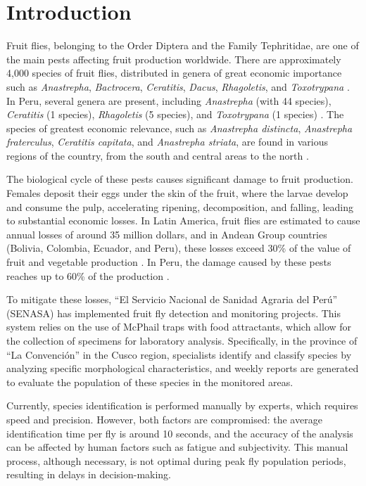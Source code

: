 \section{Introduction}
Fruit flies, belonging to the Order Diptera and the Family Tephritidae, are one of the main pests affecting fruit production worldwide. There are approximately 4,000 species of fruit flies, distributed in genera of great economic importance such as \textit{Anastrepha}, \textit{Bactrocera}, \textit{Ceratitis}, \textit{Dacus}, \textit{Rhagoletis}, and \textit{Toxotrypana} \cite{3ortiz2021, delgado2009moscas}. In Peru, several genera are present, including \textit{Anastrepha} (with 44 species), \textit{Ceratitis} (1 species), \textit{Rhagoletis} (5 species), and \textit{Toxotrypana} (1 species) \cite{iica1997}. The species of greatest economic relevance, such as \textit{Anastrepha distincta}, \textit{Anastrepha fraterculus}, \textit{Ceratitis capitata}, and \textit{Anastrepha striata}, are found in various regions of the country, from the south and central areas to the north \cite{senasa2011}.

The biological cycle of these pests causes significant damage to fruit production. Females deposit their eggs under the skin of the fruit, where the larvae develop and consume the pulp, accelerating ripening, decomposition, and falling, leading to substantial economic losses. In Latin America, fruit flies are estimated to cause annual losses of around 35 million dollars, and in Andean Group countries (Bolivia, Colombia, Ecuador, and Peru), these losses exceed 30\% of the value of fruit and vegetable production \cite{1municipalidad_echarati}. In Peru, the damage caused by these pests reaches up to 60\% of the production \cite{2senasa_erradicacion}.

To mitigate these losses, ``El Servicio Nacional de Sanidad Agraria del Perú'' (SENASA) has implemented fruit fly detection and monitoring projects. This system relies on the use of McPhail traps with food attractants, which allow for the collection of specimens for laboratory analysis. Specifically, in the province of ``La Convención'' in the Cusco region, specialists identify and classify species by analyzing specific morphological characteristics, and weekly reports are generated to evaluate the population of these species in the monitored areas.

Currently, species identification is performed manually by experts, which requires speed and precision. However, both factors are compromised: the average identification time per fly is around 10 seconds, and the accuracy of the analysis can be affected by human factors such as fatigue and subjectivity. This manual process, although necessary, is not optimal during peak fly population periods, resulting in delays in decision-making.

